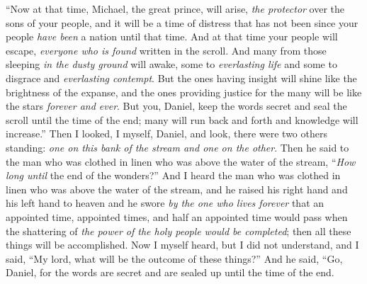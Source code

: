 \begin{biblechapter} %
 “Now at that time, Michael, the great prince, will arise, \textit{the protector} over the sons of your people, and it will be a time of distress that has not been since your people \textit{have been} a nation until that time. And at that time your people will escape, \textit{everyone who is found} written in the scroll.
\verse And many from those sleeping \textit{in the dusty ground} will awake, some to \textit{everlasting life} and some to disgrace and \textit{everlasting contempt}.
\verse But the ones having insight will shine like the brightness of the expanse, and the ones providing justice for the many will be like the stars \textit{forever and ever}.
\verse But you, Daniel, keep the words secret and seal the scroll until the time of the end; many will run back and forth and knowledge will increase.”
\verse Then I looked, I myself, Daniel, and look, there were two others standing: \textit{one on this bank of the stream and one on the other}.
\verse Then he said to the man who was clothed in linen who was above the water of the stream, “\textit{How long until} the end of the wonders?”
\verse And I heard the man who was clothed in linen who was above the water of the stream, and he raised his right hand and his left hand to heaven and he swore \textit{by the one who lives forever} that an appointed time, appointed times, and half an appointed time would pass when the shattering of \textit{the power of the holy people} \textit{would be completed}; then all these things will be accomplished.
 Now I myself heard, but I did not understand, and I said, “My lord, what will be the outcome of these things?”
\verse And he said, “Go, Daniel, for the words are secret and are sealed up until the time of the end.

\end{biblechapter}
